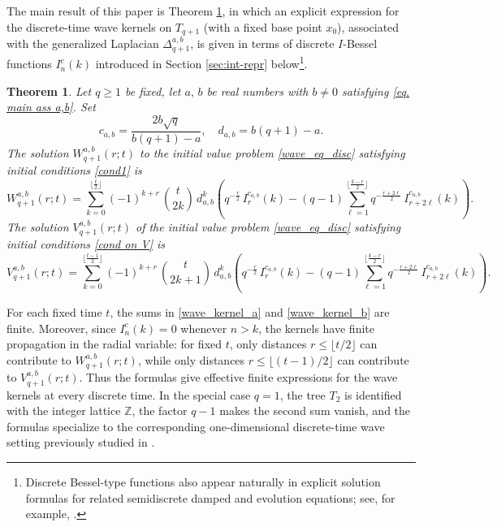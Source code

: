 \documentclass[12pt]{amsart}
\numberwithin{equation}{section}
\newtheorem{theorem}{Theorem}[section]
\theoremstyle{boldremark}
\begin{document}
The main result of this paper is Theorem \ref{Tqkernel_a}, in which an explicit expression for the discrete-time wave kernels on $T_{q+1}$ (with a fixed base point $x_0$), associated with the generalized Laplacian $\Delta_{q+1}^{a,b}$, is given in terms of discrete $I$-Bessel functions $I_{n}^{c}(k)$ introduced in Section \ref{sec:int-repr} below\footnote{Discrete Bessel-type functions also appear naturally in explicit solution formulas for related semidiscrete damped and evolution equations; see, for example, \cite{LM-A23,LM-A24}.}.
\begin{theorem}\label{Tqkernel_a}
Let $q\geq 1$ be fixed, let $a,\, b$ be real numbers with $b\neq 0$ satisfying \eqref{eq. main ass a,b}. Set
$$c_{a,b} = \dfrac{2b\sqrt{q}}{b(q+1) - a}, \quad d_{a,b}=b(q+1)-a.$$ 
The solution $W^{a,b}_{q+1}(r;t)$ to the initial value problem \eqref{wave_eq_disc}
satisfying initial conditions \eqref{cond1}
is
\begin{equation}\label{wave_kernel_a}
W^{a,b}_{q+1}(r;t)
=\sum_{k=0}^{\lfloor \frac{t}{2} \rfloor} (-1)^{k+r}\, \binom{t}{2k}\, d_{a,b}^k
\left(
q^{-\tfrac{r}{2}}\, I_r^{c_{a,b}}(k)
- (q - 1) \sum_{\ell=1}^{\lfloor \tfrac{k - r}{2} \rfloor} q^{-\tfrac{r+ 2\ell}{2}}\, I_{r + 2\ell}^{c_{a,b}}(k)
\right).
\end{equation}
The solution $V^{a,b}_{q+1}(r;t)$ of the initial value problem \eqref{wave_eq_disc}
satisfying initial conditions \eqref{cond on V} is
\begin{equation}\label{wave_kernel_b}
V^{a,b}_{q+1}(r;t)
=\sum_{k=0}^{\lfloor \frac{t-1}{2} \rfloor} (-1)^{k+r}\, \binom{t}{2k+1}\, d_{a,b}^k
\left(
q^{-\tfrac{r}{2}}\, I_r^{c_{a,b}}(k)
- (q - 1) \sum_{\ell=1}^{\lfloor \tfrac{k - r}{2} \rfloor} q^{-\tfrac{r+ 2\ell}{2}}\, I_{r + 2\ell}^{c_{a,b}}(k)
\right).
\end{equation}
\end{theorem}

For each fixed time $t$, the sums in \eqref{wave_kernel_a} and \eqref{wave_kernel_b} are finite. Moreover, since $I_n^c(k)=0$ whenever $n>k$, the kernels have finite propagation in the radial variable: for fixed $t$, only distances $r\leq \lfloor t/2\rfloor$ can contribute to $W_{q+1}^{a,b}(r;t)$, while only distances $r\leq \lfloor (t-1)/2\rfloor$ can contribute to $V_{q+1}^{a,b}(r;t)$. Thus the formulas give effective finite expressions for the wave kernels at every discrete time. In the special case $q=1$, the tree $T_2$ is identified with the integer lattice $\mathbb Z$, the factor $q-1$ makes the second sum vanish, and the formulas specialize to the corresponding one-dimensional discrete-time wave setting previously studied in \cite{BSS24, Slav17,Slav18}.
\end{document}
